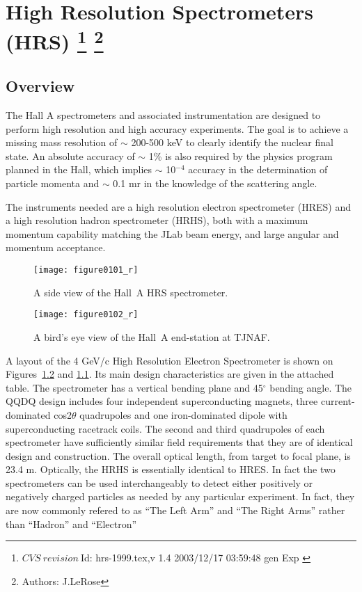 \chapter[High Resolution Spectrometers (HRS)]{High Resolution Spectrometers (HRS)
\footnote{
  $CVS~revision~ $Id: hrs-1999.tex,v 1.4 2003/12/17 03:59:48 gen Exp $ $ 
}
\footnote{Authors: J.LeRose }
}
\label{chap:hrs}
\section{Overview}
   
The Hall A spectrometers and associated instrumentation are designed to 
perform high resolution and high accuracy experiments.  The goal is to 
achieve a missing mass resolution of $\sim$ 200-500 keV to clearly 
identify the nuclear final state.  An absolute accuracy of $\sim$ 1\% is 
also required by the physics program planned in the Hall, which implies 
$\sim$ 10$^{-4}$ accuracy in the determination of particle momenta and 
$\sim$ 0.1 mr in the knowledge of the scattering angle.

The instruments needed are a high resolution electron spectrometer 
(HRES) and a high resolution hadron spectrometer (HRHS), both with a 
maximum momentum capability matching the JLab beam energy, and large 
angular and momentum acceptance.

\begin{figure}[tbp]
\begin{center}
\texttt{[image: figure0101\_r]}
\caption[Spectrometers: Elevation View of Hall~A HRS]{A side view of the Hall~A
HRS spectrometer.}  
\label{fig:hrs_ev}
\end{center}
\end{figure}
 
\begin{figure}[tbp]
\begin{center}
\texttt{[image: figure0102\_r]}
\caption[Spectrometers: Plan View of Hall~A]{A bird's eye view of the Hall~A
end-station at TJNAF.}  
\label{fig:hrs_pv}
\end{center}
\end{figure}


A layout of the 4 GeV/c High Resolution Electron Spectrometer is shown 
on Figures~\ref{fig:hrs_pv} and \ref{fig:hrs_ev}.
Its main design characteristics are 
given in the attached table.  The spectrometer has a vertical bending 
plane and 45$^{\circ}$ bending angle.  The QQDQ design includes four 
independent superconducting magnets, three current-dominated 
cos2$\theta $ quadrupoles and one iron-dominated dipole with 
superconducting racetrack coils.  The second and third quadrupoles of 
each spectrometer have sufficiently similar field requirements that they 
are of identical design and construction.  The overall optical length, 
from target to focal plane, is 23.4 m.  Optically, the HRHS 
is essentially identical to HRES. In fact the two spectrometers can be used 
interchangeably to detect either positively or negatively charged particles 
as needed by any particular experiment. In fact, they are now commonly refered to 
as ``The Left Arm'' and ``The Right Arms'' rather than ``Hadron'' and ``Electron'' 

